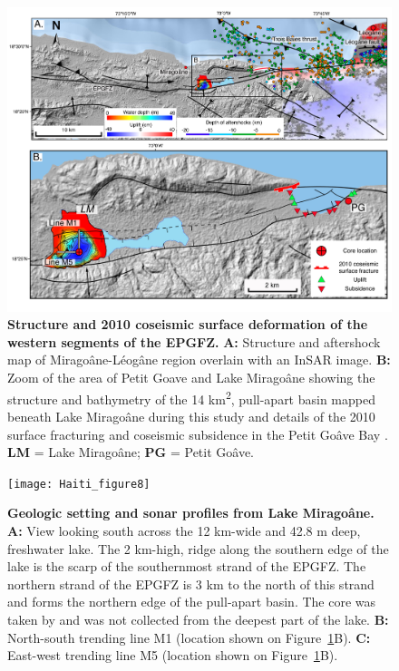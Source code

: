 \documentclass[linenumbers,draft]{agujournal}
\begin{document}
\begin{figure}
\centering
\includegraphics[width=\textwidth]{Haiti_figure7}
\caption{\textbf{Structure and 2010 coseismic surface deformation of the western segments of the EPGFZ.} \textbf{A:} Structure \citep{prentice2010seismic} and aftershock \citep{douilly2015three} map of Mirago\^ane-L\'eog\^ane region overlain with an InSAR image. \textbf{B:} Zoom of the area of Petit Goave and Lake Mirago\^ane showing the structure and bathymetry of the 14 km\textsuperscript{2}, pull-apart basin mapped beneath Lake Mirago\^ane during this study and details of the 2010 surface fracturing and coseismic subsidence in the Petit Go\^ave Bay \citep{prentice2010seismic}. \textbf{LM} = Lake Mirago\^ane; \textbf{PG} = Petit Go\^ave.}
\label{figure7}
\end{figure}

\begin{figure}
\centering
\texttt{[image: Haiti\_figure8]}
\caption{\textbf{Geologic setting and sonar profiles from Lake Mirago\^ane.} \textbf{A:} View looking south across the 12 km-wide and 42.8 m deep, freshwater lake. The 2 km-high, ridge along the southern edge of the lake is the scarp of the southernmost strand of the EPGFZ. The northern strand of the EPGFZ is 3 km to the north of this strand and forms the northern edge of the pull-apart basin. The core was taken by \citet{higuera199910} and was not collected from the deepest part of the lake. \textbf{B:} North-south trending line M1 (location shown on Figure~\ref{figure7}B). \textbf{C:} East-west trending line M5 (location shown on Figure~\ref{figure7}B).}
\label{figure8}
\end{figure}
\end{document}
